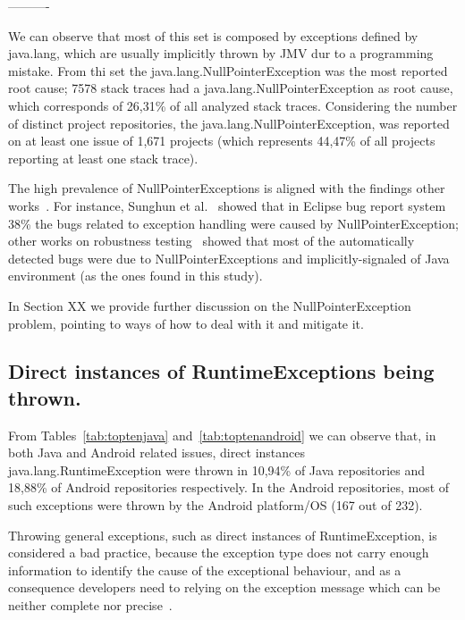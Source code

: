 \documentclass[conference]{IEEEtran}
\begin{document}
----------

We can observe that most of this set is composed by exceptions defined by java.lang,
which are usually implicitly thrown by JMV dur to a programming mistake. From thi set
the java.lang.NullPointerException  was the most reported root cause;  7578 stack traces 
had a java.lang.NullPointerException  as root cause, which corresponds of 26,31\%  of 
all analyzed stack traces. Considering the number of distinct project repositories, 
the java.lang.NullPointerException, was reported on at least one issue of 1,671 projects 
(which represents 44,47\% of all projects reporting at least one stack trace).

The high prevalence of NullPointerExceptions is aligned with the findings other 
works~\cite{kim2013predicting,fraser20131600,csallner2004jcrasher}. For instance, Sunghun et
al.~\cite{kim2013predicting} showed that in Eclipse bug report system 38\% the bugs 
related to exception handling were caused by NullPointerException; other works on robustness 
testing~\cite{maji2012empirical,csallner2004jcrasher} showed that most of the automatically 
detected bugs were due to NullPointerExceptions and implicitly-signaled of Java
environment (as the ones found in this study).

In Section XX we provide further discussion on the NullPointerException problem, pointing 
to ways of how to deal with it and mitigate it.


\subsection{Direct instances of RuntimeExceptions being thrown.}

From Tables~\ref{tab:toptenjava} and~\ref{tab:toptenandroid} we can observe that,
in both Java and Android related issues, direct instances
java.lang.RuntimeException were thrown  in 10,94\% of Java repositories and
18,88\% of Android repositories respectively. 
In the Android repositories, most of such exceptions  were  thrown by the Android 
platform/OS (167 out of 232).

Throwing general exceptions, such as direct instances of RuntimeException, is  considered a
bad practice, because the exception type does not carry enough information to identify the
cause of the exceptional behaviour, and as a consequence developers need to relying on
the exception message which can be neither complete nor precise~\cite{gosling2000java}.
\end{document}

